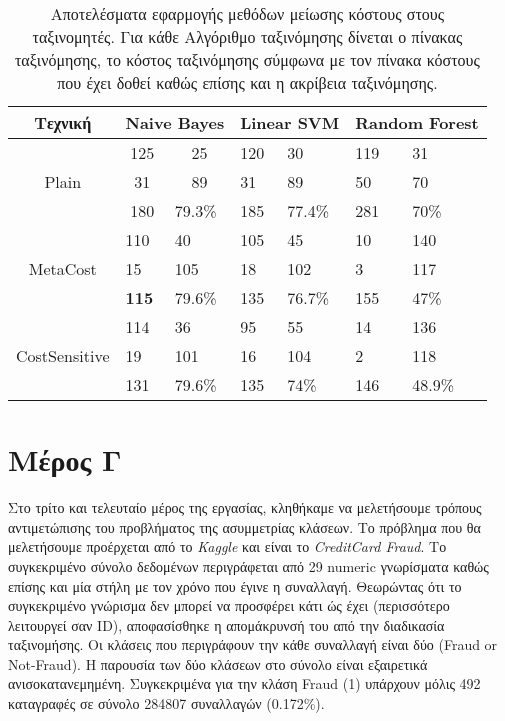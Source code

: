 \begin{table}[]
	\centering
	\caption{Αποτελέσματα εφαρμογής μεθόδων μείωσης κόστους στους ταξινομητές. Για κάθε Αλγόριθμο ταξινόμησης δίνεται ο πίνακας ταξινόμησης, το κόστος ταξινόμησης σύμφωνα με τον πίνακα κόστους που έχει δοθεί καθώς επίσης και η ακρίβεια ταξινόμησης.}
	\label{tab:cost}
	\begin{tabular}{|c|ll|ll|ll|}
	\hline
	Τεχνική & \multicolumn{2}{l|}{Naive Bayes} & \multicolumn{2}{l|}{Linear SVM} & \multicolumn{2}{l|}{Random Forest} \\ \hline
	\multirow{3}{*}{Plain} & \multicolumn{1}{c}{125} & \multicolumn{1}{c|}{25} & 120 & 30 & 119 & 31 \\
	& \multicolumn{1}{c}{31}  & \multicolumn{1}{c|}{89} & 31  & 89 & 50 & 70 \\ \cline{2-7} 
	& \multicolumn{1}{c}{180} & 79.3\% & 185 & 77.4\%   & 281 & 70\% \\ \hline
	\multirow{3}{*}{MetaCost} & 110    & 40  & 105      & 45  & 10 & 140 \\
						  	  & 15     & 105 & 18       & 102 & 3  & 117              \\ \cline{2-7} 
	& \textbf{115}            & 79.6\% & 135 & 76.7\%   & 155 & 47\%        \\ \hline
	\multirow{3}{*}{CostSensitive} & 114                     & 36                      & 95             & 55             & 14              & 136              \\
	& 19                      & 101                     & 16             & 104            & 2               & 118              \\ \cline{2-7} 
	& 131                     & 79.6\%                    & 135            & 74\%           & 146             & 48.9\%             \\ \hline
\end{tabular}
\end{table}

\section{Μέρος Γ}
Στο τρίτο και τελευταίο μέρος της εργασίας, κληθήκαμε να μελετήσουμε τρόπους αντιμετώπισης του προβλήματος της ασυμμετρίας κλάσεων. Το πρόβλημα που θα μελετήσουμε προέρχεται από το \emph{Kaggle} και είναι το \emph{CreditCard Fraud}. Το συγκεκριμένο σύνολο δεδομένων περιγράφεται από 29 numeric γνωρίσματα καθώς επίσης και μία στήλη με τον χρόνο που έγινε η συναλλαγή. Θεωρώντας ότι το συγκεκριμένο γνώρισμα δεν μπορεί να προσφέρει κάτι ώς έχει (περισσότερο λειτουργεί σαν ID), αποφασίσθηκε η απομάκρυνσή του από την διαδικασία ταξινομήσης. Οι κλάσεις που περιγράφουν την κάθε συναλλαγή είναι δύο (Fraud or Not-Fraud). 
Η παρουσία των δύο κλάσεων στο σύνολο είναι εξαιρετικά ανισοκατανεμημένη. Συγκεκριμένα για την κλάση Fraud (1) υπάρχουν μόλις 492 καταγραφές σε σύνολο 284807 συναλλαγών (0.172\%). 
